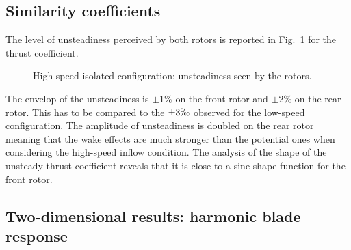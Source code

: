 
\subsection{Similarity coefficients}
\label{sub:dream_hs_hb_sim_coeff}


The level of unsteadiness perceived by both rotors is reported
in Fig.~\ref{fig:dream_hs_hb_unst_coeff} for the thrust coefficient.
\begin{figure}[htp]
  \centering
  \caption{High-speed isolated configuration: unsteadiness seen by the rotors.}
  \label{fig:dream_hs_hb_unst_coeff}
\end{figure}
The envelop of the unsteadiness is $\pm 1\%$ on the front rotor
and $\pm 2\%$ on the rear rotor. This has to be compared to 
the $\pm 3 \permil$ observed for the low-speed configuration.
The amplitude of unsteadiness is doubled on the rear rotor
meaning that the wake effects are much stronger than the
potential ones when considering the high-speed inflow condition.
The analysis of the shape of the unsteady thrust coefficient
reveals that it is close to a sine shape function for the front
rotor.

\subsection{Two-dimensional results: harmonic blade response}
\label{sub:dream_hs_hb_blade_response}

